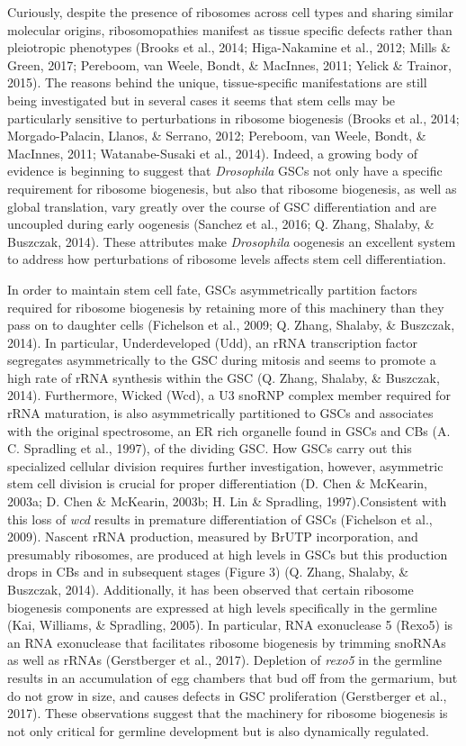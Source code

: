 \documentclass[12pt,oneside]{reedthesis}
\begin{document}
Curiously, despite the presence of ribosomes across cell types and
sharing similar molecular origins, ribosomopathies manifest as tissue
specific defects rather than pleiotropic phenotypes (Brooks et al., 2014; Higa-Nakamine et al., 2012; Mills \& Green, 2017; Pereboom, van Weele, Bondt, \& MacInnes, 2011; Yelick \& Trainor, 2015).
The reasons behind the unique, tissue-specific manifestations are still
being investigated but in several cases it seems that stem cells may be
particularly sensitive to perturbations in ribosome biogenesis
(Brooks et al., 2014; Morgado-Palacin, Llanos, \& Serrano, 2012; Pereboom, van Weele, Bondt, \& MacInnes, 2011; Watanabe-Susaki et al., 2014). Indeed, a growing body of evidence is beginning
to suggest that \emph{Drosophila} GSCs not only have a specific requirement
for ribosome biogenesis, but also that ribosome biogenesis, as well as
global translation, vary greatly over the course of GSC differentiation
and are uncoupled during early oogenesis (Sanchez et al., 2016; Q. Zhang, Shalaby, \& Buszczak, 2014). These attributes make \emph{Drosophila} oogenesis an
excellent system to address how perturbations of ribosome levels affects
stem cell differentiation.

In order to maintain stem cell fate, GSCs asymmetrically partition
factors required for ribosome biogenesis by retaining more of this
machinery than they pass on to daughter cells (Fichelson et al., 2009; Q. Zhang, Shalaby, \& Buszczak, 2014). In particular, Underdeveloped (Udd), an rRNA
transcription factor segregates asymmetrically to the GSC during mitosis
and seems to promote a high rate of rRNA synthesis within the GSC
(Q. Zhang, Shalaby, \& Buszczak, 2014). Furthermore, Wicked (Wcd), a U3 snoRNP complex member
required for rRNA maturation, is also asymmetrically partitioned to GSCs
and associates with the original spectrosome, an ER rich organelle found
in GSCs and CBs (A. C. Spradling et al., 1997), of the dividing GSC. How GSCs
carry out this specialized cellular division requires further
investigation, however, asymmetric stem cell division is crucial for
proper differentiation (D. Chen \& McKearin, 2003a; D. Chen \& McKearin, 2003b; H. Lin \& Spradling, 1997).Consistent with this loss of \emph{wcd} results in premature
differentiation of GSCs (Fichelson et al., 2009). Nascent rRNA production,
measured by BrUTP incorporation, and presumably ribosomes, are produced
at high levels in GSCs but this production drops in CBs and in
subsequent stages (Figure 3) (Q. Zhang, Shalaby, \& Buszczak, 2014). Additionally, it has been
observed that certain ribosome biogenesis components are expressed at
high levels specifically in the germline (Kai, Williams, \& Spradling, 2005). In particular,
RNA exonuclease 5 (Rexo5) is an RNA exonuclease that facilitates
ribosome biogenesis by trimming snoRNAs as well as rRNAs
(Gerstberger et al., 2017). Depletion of \emph{rexo5} in the germline results in
an accumulation of egg chambers that bud off from the germarium, but do
not grow in size, and causes defects in GSC proliferation
(Gerstberger et al., 2017). These observations suggest that the machinery for
ribosome biogenesis is not only critical for germline development but is
also dynamically regulated.
\end{document}
